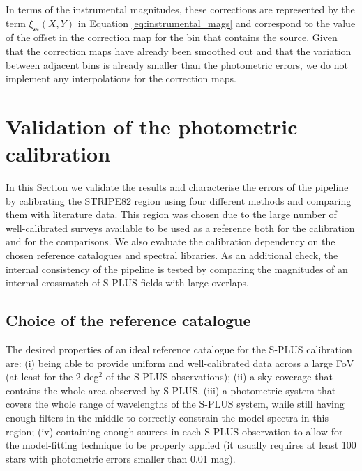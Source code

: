 \documentclass[fleqn,usenatbib]{mnras}
\begin{document}
In terms of the instrumental magnitudes, these corrections are represented by the term $\xi_\mathcal{m}(X,Y)$ in Equation \ref{eq:instrumental_mags} and correspond to the value of the offset in the correction map for the bin that contains the source. Given that the correction maps have already been smoothed out and that the variation between adjacent bins is already smaller than the photometric errors, we do not implement any interpolations for the correction maps.


 
\section{Validation of the photometric calibration}
\label{sec::Calibration_validation}

In this Section we validate the results and characterise the errors of the pipeline by calibrating the STRIPE82 region using four different methods and comparing them with literature data. This region was chosen due to the large number of well-calibrated surveys available to be used as a reference both for the calibration and for the comparisons. We also evaluate the calibration dependency on the chosen reference catalogues and spectral libraries. As an additional check, the internal consistency of the pipeline is tested by comparing the magnitudes of an internal crossmatch of S-PLUS fields with large overlaps. 

\subsection{Choice of the reference catalogue}

The desired properties of an ideal reference catalogue for the S-PLUS calibration are: (i) being able to provide uniform and well-calibrated data across a large FoV (at least for the 2 deg$^2$ of the S-PLUS observations); (ii) a sky coverage that contains the whole area observed by S-PLUS, (iii) a photometric system that covers the whole range of wavelengths of the S-PLUS system, while still having enough filters in the middle to correctly constrain the model spectra in this region; (iv) containing enough sources in each S-PLUS observation to allow for the model-fitting technique to be properly applied (it usually requires at least 100 stars with photometric errors smaller than 0.01 mag).
\end{document}
